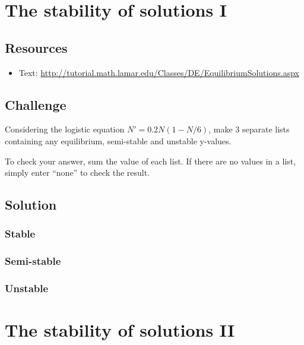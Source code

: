 \newpage
\section{The stability of solutions I}

\subsection*{Resources}
\begin{itemize}
    \item Text: \url{http://tutorial.math.lamar.edu/Classes/DE/EquilibriumSolutions.aspx}
\end{itemize}

\subsection*{Challenge}
Considering the logistic equation $N'=0.2N(1-N/6)$, make 3 separate lists containing any equilibrium, semi-stable and unstable y-values.

To check your answer, sum the value of each list. If there are no values in a list, simply enter ``none'' to check the result.

\subsection*{Solution}
\subsubsection*{Stable}
\six{}


\subsubsection*{Semi-stable}
\six{}


\subsubsection*{Unstable}
\six{}


\timebox



\newpage
\section{The stability of solutions II}

